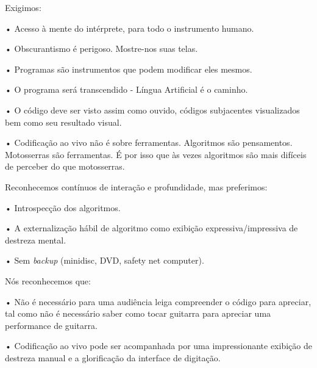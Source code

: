 \begin{citacao}
Exigimos:

• Acesso à mente do intérprete, para todo o instrumento humano.

• Obscurantismo é perigoso. Mostre-nos suas telas.

• Programas são instrumentos que podem modificar eles mesmos.

• O programa será transcendido - Língua Artificial é o caminho.

• O código deve ser visto assim como ouvido, códigos subjacentes visualizados bem como seu resultado visual.

• Codificação ao vivo não é sobre ferramentas. Algoritmos são pensamentos. Motosserras são ferramentas. É por isso que às vezes algoritmos são mais difíceis de perceber do que motosserras.

Reconhecemos contínuos de interação e profundidade, mas preferimos:

• Introspecção dos algoritmos.

• A externalização hábil de algoritmo como exibição expressiva/impressiva de destreza mental.

• Sem \emph{backup} (minidisc, DVD, safety net computer).

Nós reconhecemos que:

• Não é necessário para uma audiência leiga compreender o código para apreciar, tal como não é necessário saber como tocar guitarra para apreciar uma performance de guitarra.

• Codificação ao vivo pode ser acompanhada por uma impressionante exibição de destreza manual e a glorificação da interface de digitação.


\end{citacao}
